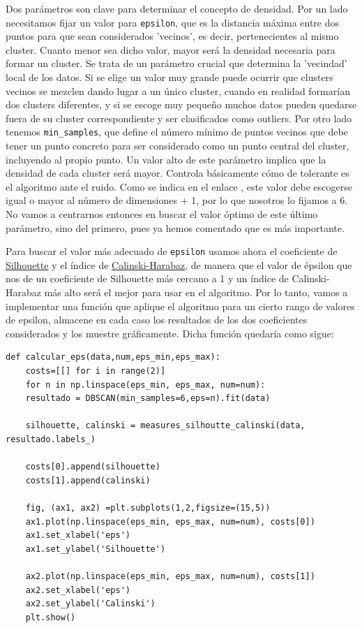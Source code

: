 \documentclass[a4paper,11pt]{book}
\begin{document}
Dos parámetros son clave para determinar el concepto de densidad.  Por un lado necesitamos fijar un valor para \texttt{epsilon}, que es la distancia máxima entre dos puntos para que sean considerados 'vecinos', es decir, pertenecientes al mismo cluster. Cuanto menor sea dicho valor, mayor será la densidad necesaria para formar un cluster. Se trata de un parámetro crucial que determina la 'vecindad' local de los datos.  Si se elige un valor muy grande  puede ocurrir que clusters vecinos se mezclen dando lugar a un único cluster, cuando en realidad formarían dos clusters diferentes, y si se escoge muy pequeño muchos datos pueden quedarse fuera de su cluster correspondiente y ser clasificados como outliers.  Por otro lado tenemos \texttt{min_samples}, que define el número mínimo de puntos vecinos que debe tener un punto concreto para ser considerado como un punto central del cluster, incluyendo al propio punto. Un valor alto de este parámetro implica que la densidad de cada cluster será mayor. Controla básicamente cómo de tolerante es el algoritmo ante el ruido. Como se indica en el enlace \cite{13}, este valor debe escogerse igual o mayor al número de dimensiones + 1, por lo que nosotros lo fijamos a 6. No vamos a centrarnos entonces en buscar el valor óptimo de este último parámetro, sino del primero, pues ya hemos comentado que es más importante.

Para buscar el valor más adecuado de \texttt{epsilon} usamos ahora el coeficiente de \underline{Silhouette} y el índice de \underline{Calinski-Harabaz}, de manera que el valor de épsilon que nos de un coeficiente de Silhouette más cercano a 1 y un índice de Calinski-Harabaz más alto será el mejor para usar en el algoritmo. Por lo tanto, vamos a implementar una función que aplique el algoritmo para un cierto rango de valores de epsilon, almacene en cada caso los resultados de los dos coeficientes considerados y los muestre gráficamente. Dicha función quedaría como sigue: 

\begin{verbatim}
def calcular_eps(data,num,eps_min,eps_max):
	costs=[[] for i in range(2)] 
	for n in np.linspace(eps_min, eps_max, num=num):
	resultado = DBSCAN(min_samples=6,eps=n).fit(data)
	
	silhouette, calinski = measures_silhoutte_calinski(data, resultado.labels_)
	
	costs[0].append(silhouette)
	costs[1].append(calinski)
	
	fig, (ax1, ax2) =plt.subplots(1,2,figsize=(15,5))
	ax1.plot(np.linspace(eps_min, eps_max, num=num), costs[0])
	ax1.set_xlabel('eps')
	ax1.set_ylabel('Silhouette')
	
	ax2.plot(np.linspace(eps_min, eps_max, num=num), costs[1])
	ax2.set_xlabel('eps')
	ax2.set_ylabel('Calinski')
	plt.show()
\end{verbatim}
\end{document}
